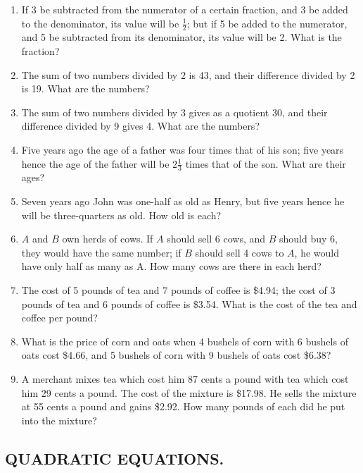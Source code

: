 \documentclass{book}
\begin{document}
\begin{enumerate}
\item If 3 be subtracted from the numerator of a certain
fraction, and 3 be added to the denominator, its value will
be $\frac{1}{2}$; but if 5 be added to the numerator, and 5 be subtracted
from its denominator, its value will be 2. What is
the fraction?

\item The sum of two numbers divided by 2 is 43, and
their difference divided by 2 is 19. What are the numbers?

\item The sum of two numbers divided by 3 gives as a
quotient 30, and their difference divided by 9 gives 4.
What are the numbers?

\item Five years ago the age of a father was four times
that of his son; five years hence the age of the father will
be $2\frac{1}{3}$ times that of the son. What are their ages?

\item Seven years ago John was one-half as old as Henry,
but five years hence he will be three-quarters as old.
How old is each?

\item $A$ and $B$ own herds of cows. If $A$ should sell 6
cows, and $B$ should buy 6, they would have the same number;
if $B$ should sell 4 cows to $A$, he would have only
half as many as A. How many cows are there in each
herd?

\item The cost of 5 pounds of tea and 7 pounds of coffee is
\$4.94; the cost of 3 pounds of tea and 6 pounds of coffee is
\$3.54. What is the cost of the tea and coffee per pound?

\item What is the price of corn and oats when 4 bushels of corn
with 6 bushels of oats cost \$4.66, and 5 bushels of corn with 9
bushels of oats cost \$6.38?

\item A merchant mixes tea which cost him 87 cents a pound with
tea which cost him 29 cents a pound. The cost of the mixture is
\$17.98. He sells the mixture at 55 cents a pound and gains
\$2.92. How many pounds of each did he put into the mixture?
\end{enumerate}



\subsection*{QUADRATIC EQUATIONS.}
\end{document}
